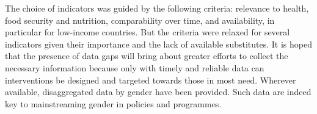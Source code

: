 The choice of indicators was guided by the following criteria: relevance to health, food security and nutrition, comparability over time, and availability, in particular for low-income countries. But the criteria were relaxed for several indicators given their importance and the lack of available substitutes. It is hoped that the presence of data gaps will bring about greater efforts to collect the necessary information because only with timely and reliable data can interventions be designed and targeted towards those in most need. Wherever available, disaggregated data by gender have been provided. Such data are indeed key to mainstreaming gender in policies and programmes.